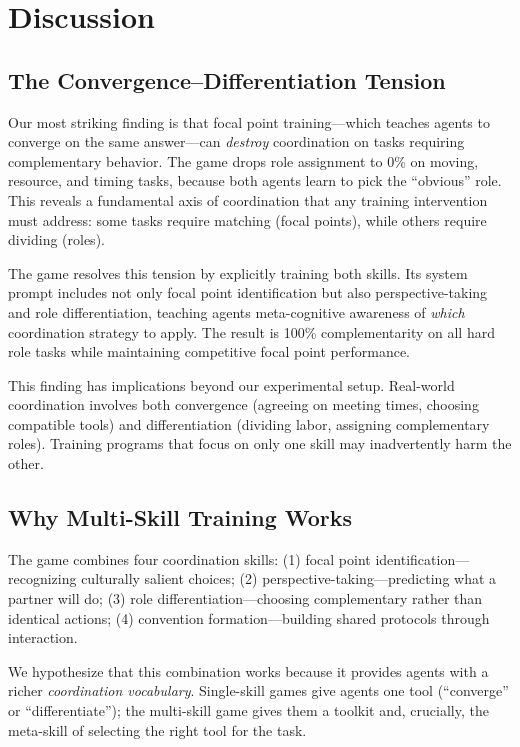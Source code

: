\section{Discussion}
\label{sec:discussion}

\subsection{The Convergence--Differentiation Tension}
\label{sec:tension}

Our most striking finding is that focal point training---which teaches agents to converge on the same answer---can \emph{destroy} coordination on tasks requiring complementary behavior.
The \focalpt game drops role assignment to 0\% on moving, resource, and timing tasks, because both agents learn to pick the ``obvious'' role.
This reveals a fundamental axis of coordination that any training intervention must address: some tasks require matching (focal points), while others require dividing (roles).

The \aidesigned game resolves this tension by explicitly training both skills.
Its system prompt includes not only focal point identification but also perspective-taking and role differentiation, teaching agents meta-cognitive awareness of \emph{which} coordination strategy to apply.
The result is 100\% complementarity on all hard role tasks while maintaining competitive focal point performance.

This finding has implications beyond our experimental setup.
Real-world coordination involves both convergence (\eg agreeing on meeting times, choosing compatible tools) and differentiation (\eg dividing labor, assigning complementary roles).
Training programs that focus on only one skill may inadvertently harm the other.

\subsection{Why Multi-Skill Training Works}
\label{sec:multiskill}

The \syncminds game combines four coordination skills:
(1) focal point identification---recognizing culturally salient choices;
(2) perspective-taking---predicting what a partner will do;
(3) role differentiation---choosing complementary rather than identical actions;
(4) convention formation---building shared protocols through interaction.

We hypothesize that this combination works because it provides agents with a richer \emph{coordination vocabulary}.
Single-skill games give agents one tool (``converge'' or ``differentiate''); the multi-skill game gives them a toolkit and, crucially, the meta-skill of selecting the right tool for the task.


